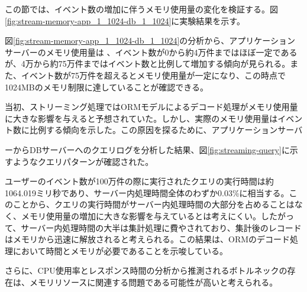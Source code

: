 \documentclass[../../../../../main]{subfiles}
\begin{document}
    \label{subsubsec:result-streaming-only-limit-memory}

    この節では、イベント数の増加に伴うメモリ使用量の変化を検証する。図\ref{fig:stream-memory-app_1_1024-db_1_1024}に実験結果を示す。

    

    図\ref{fig:stream-memory-app_1_1024-db_1_1024}の分析から、アプリケーションサーバーのメモリ使用量は 、イベント数が0から約4万件まではほぼ一定であるが、4万から約75万件まではイベント数と比例して増加する傾向が見られる。また、イベント数が75万件を超えるとメモリ使用量が一定になり、この時点で1024MBのメモリ制限に達していることが確認できる。

    当初、ストリーミング処理ではORMモデルによるデコード処理がメモリ使用量に大きな影響を与えると予想されていた。しかし、実際のメモリ使用量はイベント数に比例する傾向を示した。この原因を探るために、アプリケーションサーバ

    ーからDBサーバーへのクエリログを分析した結果、図\ref{fig:streaming-query}に示すようなクエリパターンが確認された。

    

    ユーザーのイベント数が100万件の際に実行されたクエリの実行時間は約1064.019ミリ秒であり、サーバー内処理時間全体のわずか0.03\%に相当する。このことから、クエリの実行時間がサーバー内処理時間の大部分を占めることはなく、メモリ使用量の増加に大きな影響を与えているとは考えにくい。したがって、サーバー内処理時間の大半は集計処理に費やされており、集計後のレコードはメモリから迅速に解放されると考えられる。この結果は、ORMのデコード処理において時間とメモリが必要であることを示唆している。

    さらに、CPU使用率とレスポンス時間の分析から推測されるボトルネックの存在は、メモリリソースに関連する問題である可能性が高いと考えられる。
\end{document}

